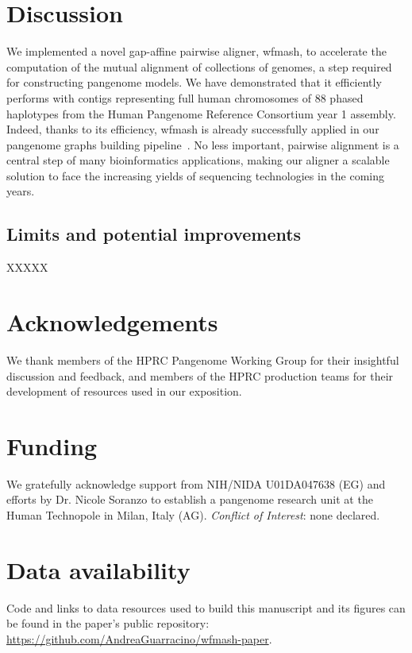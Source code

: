 \documentclass{bioinfo}
\theoremstyle{definition}
\begin{document}
\section{Discussion}
\label{sec:discussion}

We implemented a novel gap-affine pairwise aligner, wfmash, to accelerate the computation of the mutual alignment of collections of genomes, a step required for constructing pangenome models.
We have demonstrated that it efficiently performs with contigs representing full human chromosomes of 88 phased haplotypes from the Human Pangenome Reference Consortium year 1 assembly.
Indeed, thanks to its efficiency, wfmash is already successfully applied in our pangenome graphs building pipeline~\citep{pggb}.
No less important, pairwise alignment is a central step of many bioinformatics applications, making our aligner a scalable solution to face the increasing yields of sequencing technologies in the coming years.


\subsection{Limits and potential improvements}

XXXXX

\section*{Acknowledgements}

We thank members of the HPRC Pangenome Working Group for their insightful discussion and feedback, and members of the HPRC production teams for their development of resources used in our exposition.

\section*{Funding}

We gratefully acknowledge support from NIH/NIDA U01DA047638 (EG) and efforts by Dr. Nicole Soranzo to establish a pangenome research unit at the Human Technopole in Milan, Italy (AG).
\linebreak
\linebreak
\textit{Conflict of Interest}: none declared.

\section*{Data availability}

Code and links to data resources used to build this manuscript and its figures can be found in the paper's public repository: \url{https://github.com/AndreaGuarracino/wfmash-paper}.




\end{document}
